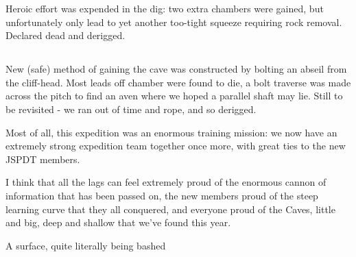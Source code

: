 Heroic effort was expended in the  dig: two extra chambers were
gained, but unfortunately only lead to yet another too-tight squeeze
requiring rock removal. Declared dead and derigged.

\subsection{}

New (safe) method of gaining the cave was constructed by bolting an
abseil from the cliff-head. Most leads off chamber were found to die, a
bolt traverse was made across the pitch to find an aven where we hoped a
parallel shaft may lie. Still to be revisited - we ran out of time and
rope, and so derigged.

Most of all, this expedition was an enormous training mission: we now
have an extremely strong expedition team together once more, with great
ties to the new JSPDT members.

I think that all the lags can feel extremely proud of the enormous
cannon of information that has been passed on, the new members proud of
the steep learning curve that they all conquered, and everyone proud of
the Caves, little and big, deep and shallow that we've found this year.


\begin{pagefigure}
      \checkoddpage \ifoddpage \forcerectofloat \else \forceversofloat \fi
      \centering
       \label{surface bashing}
  \caption{A surface, quite literally being bashed }
\end{pagefigure}


